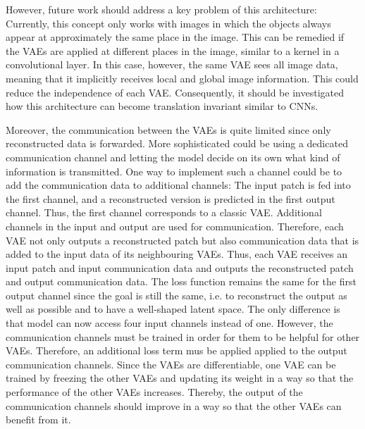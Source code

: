 However, future work should address a key problem of this architecture: Currently, this concept only works with images in which the objects always appear at approximately the same place in the image. This can be remedied if the VAEs are applied at different places in the image, similar to a kernel in a convolutional layer. In this case, however, the same VAE sees all image data, meaning that it implicitly receives local and global image information. This could reduce the independence of each VAE. Consequently, it should be investigated how this architecture can become translation invariant similar to CNNs.

Moreover, the communication between the VAEs is quite limited since only reconstructed data is forwarded. More sophisticated could be using a dedicated communication channel and letting the model decide on its own what kind of information is transmitted. One way to implement such a channel could be to add the communication data to additional channels: The input patch is fed into the first channel, and a reconstructed version is predicted in the first output channel. Thus, the first channel corresponds to a classic VAE. Additional channels in the input and output are used for communication. Therefore, each VAE not only outputs a reconstructed patch but also communication data that is added to the input data of its neighbouring VAEs. Thus, each VAE receives an input patch and input communication data and outputs the reconstructed patch and output communication data. 
The loss function remains the same for the first output channel since the goal is still the same, i.e. to reconstruct the output as well as possible and to have a well-shaped latent space. The only difference is that model can now access four input channels instead of one. However, the communication channels must be trained in order for them to be helpful for other VAEs. Therefore, an additional loss term mus be applied applied to the output communication channels. Since the VAEs are differentiable, one VAE can be trained by freezing the other VAEs and updating its weight in a way so that the performance of the other VAEs increases. Thereby, the output of the communication channels should improve in a way so that the other VAEs can benefit from it.




